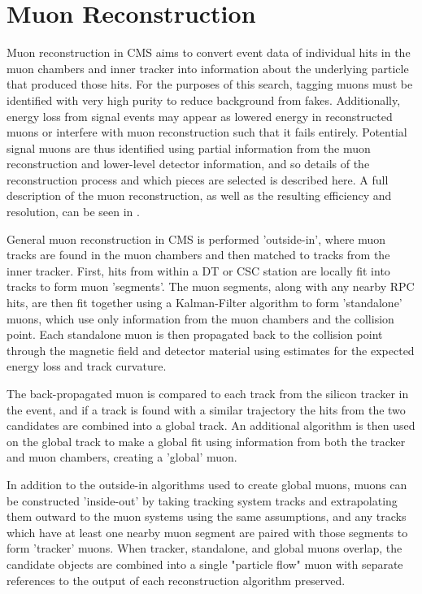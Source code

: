 \section{Muon Reconstruction}
\label{sec:muonReco}
Muon reconstruction in CMS aims to convert event data of individual hits in the muon chambers and inner tracker into information about the underlying particle that produced those hits.
For the purposes of this search, tagging muons must be identified with very high purity to reduce background from fakes. 
Additionally, energy loss from signal events may appear as lowered energy in reconstructed muons or interfere with muon reconstruction such that it fails entirely.
Potential signal muons are thus identified using partial information from the muon reconstruction and lower-level detector information, and so details of the reconstruction process and which pieces are selected is described here.
A full description of the muon reconstruction, as well as the resulting efficiency and resolution, can be seen in \cite{cmsMuonPerformance}.

General muon reconstruction in CMS is performed 'outside-in', where muon tracks are found in the muon chambers and then matched to tracks from the inner tracker.
First, hits from within a DT or CSC station are locally fit into tracks to form muon 'segments'.
The muon segments, along with any nearby RPC hits, are then fit together using a Kalman-Filter algorithm to form 'standalone' muons, which use only information from the muon chambers and the collision point.
Each standalone muon is then propagated back to the collision point through the magnetic field and detector material using estimates for the expected energy loss and track curvature.

The back-propagated muon is compared to each track from the silicon tracker in the event, and if a track is found with a similar trajectory the hits from the two candidates are combined into a global track.
An additional \kf algorithm is then used on the global track to make a global fit using information from both the tracker and muon chambers, creating a 'global' muon. 

In addition to the outside-in algorithms used to create global muons, muons can be constructed 'inside-out' by taking tracking system tracks and extrapolating them outward to the muon systems using the same assumptions, and any tracks which have at least one nearby muon segment are paired with those segments to form 'tracker' muons. 
When tracker, standalone, and global muons overlap, the candidate objects are combined into a single "particle flow" muon with separate references to the output of each reconstruction algorithm preserved.

